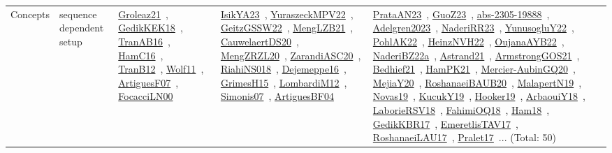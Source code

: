 {\begin{longtable}{lp{3cm}>{\raggedright\arraybackslash}p{6cm}>{\raggedright\arraybackslash}p{6cm}>{\raggedright\arraybackslash}p{8cm}}
Concepts & sequence dependent setup & \href{../works/Groleaz21.pdf}{Groleaz21}~\cite{Groleaz21}, \href{../works/GedikKEK18.pdf}{GedikKEK18}~\cite{GedikKEK18}, \href{../works/TranAB16.pdf}{TranAB16}~\cite{TranAB16}, \href{../works/HamC16.pdf}{HamC16}~\cite{HamC16}, \href{../works/TranB12.pdf}{TranB12}~\cite{TranB12}, \href{../works/Wolf11.pdf}{Wolf11}~\cite{Wolf11}, \href{../works/ArtiguesF07.pdf}{ArtiguesF07}~\cite{ArtiguesF07}, \href{../works/FocacciLN00.pdf}{FocacciLN00}~\cite{FocacciLN00} & \href{../works/IsikYA23.pdf}{IsikYA23}~\cite{IsikYA23}, \href{../works/YuraszeckMPV22.pdf}{YuraszeckMPV22}~\cite{YuraszeckMPV22}, \href{../works/GeitzGSSW22.pdf}{GeitzGSSW22}~\cite{GeitzGSSW22}, \href{../works/MengLZB21.pdf}{MengLZB21}~\cite{MengLZB21}, \href{../works/CauwelaertDS20.pdf}{CauwelaertDS20}~\cite{CauwelaertDS20}, \href{../works/MengZRZL20.pdf}{MengZRZL20}~\cite{MengZRZL20}, \href{../works/ZarandiASC20.pdf}{ZarandiASC20}~\cite{ZarandiASC20}, \href{../works/RiahiNS018.pdf}{RiahiNS018}~\cite{RiahiNS018}, \href{../works/Dejemeppe16.pdf}{Dejemeppe16}~\cite{Dejemeppe16}, \href{../works/GrimesH15.pdf}{GrimesH15}~\cite{GrimesH15}, \href{../works/LombardiM12.pdf}{LombardiM12}~\cite{LombardiM12}, \href{../works/Simonis07.pdf}{Simonis07}~\cite{Simonis07}, \href{../works/ArtiguesBF04.pdf}{ArtiguesBF04}~\cite{ArtiguesBF04} & \href{../works/PrataAN23.pdf}{PrataAN23}~\cite{PrataAN23}, \href{../works/GuoZ23.pdf}{GuoZ23}~\cite{GuoZ23}, \href{../works/abs-2305-19888.pdf}{abs-2305-19888}~\cite{abs-2305-19888}, \href{../works/Adelgren2023.pdf}{Adelgren2023}~\cite{Adelgren2023}, \href{../works/NaderiRR23.pdf}{NaderiRR23}~\cite{NaderiRR23}, \href{../works/YunusogluY22.pdf}{YunusogluY22}~\cite{YunusogluY22}, \href{../works/PohlAK22.pdf}{PohlAK22}~\cite{PohlAK22}, \href{../works/HeinzNVH22.pdf}{HeinzNVH22}~\cite{HeinzNVH22}, \href{../works/OujanaAYB22.pdf}{OujanaAYB22}~\cite{OujanaAYB22}, \href{../works/NaderiBZ22a.pdf}{NaderiBZ22a}~\cite{NaderiBZ22a}, \href{../works/Astrand21.pdf}{Astrand21}~\cite{Astrand21}, \href{../works/ArmstrongGOS21.pdf}{ArmstrongGOS21}~\cite{ArmstrongGOS21}, \href{../works/Bedhief21.pdf}{Bedhief21}~\cite{Bedhief21}, \href{../works/HamPK21.pdf}{HamPK21}~\cite{HamPK21}, \href{../works/Mercier-AubinGQ20.pdf}{Mercier-AubinGQ20}~\cite{Mercier-AubinGQ20}, \href{../works/MejiaY20.pdf}{MejiaY20}~\cite{MejiaY20}, \href{../works/RoshanaeiBAUB20.pdf}{RoshanaeiBAUB20}~\cite{RoshanaeiBAUB20}, \href{../works/MalapertN19.pdf}{MalapertN19}~\cite{MalapertN19}, \href{../works/Novas19.pdf}{Novas19}~\cite{Novas19}, \href{../works/KucukY19.pdf}{KucukY19}~\cite{KucukY19}, \href{../works/Hooker19.pdf}{Hooker19}~\cite{Hooker19}, \href{../works/ArbaouiY18.pdf}{ArbaouiY18}~\cite{ArbaouiY18}, \href{../works/LaborieRSV18.pdf}{LaborieRSV18}~\cite{LaborieRSV18}, \href{../works/FahimiOQ18.pdf}{FahimiOQ18}~\cite{FahimiOQ18}, \href{../works/Ham18.pdf}{Ham18}~\cite{Ham18}, \href{../works/GedikKBR17.pdf}{GedikKBR17}~\cite{GedikKBR17}, \href{../works/EmeretlisTAV17.pdf}{EmeretlisTAV17}~\cite{EmeretlisTAV17}, \href{../works/RoshanaeiLAU17.pdf}{RoshanaeiLAU17}~\cite{RoshanaeiLAU17}, \href{../works/Pralet17.pdf}{Pralet17}~\cite{Pralet17}... (Total: 50)\\

\end{longtable}}
